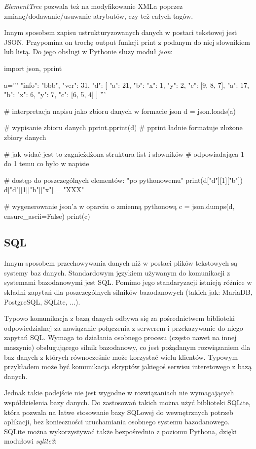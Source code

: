 \textit{ElementTree} pozwala też na modyfikowanie XMLa poprzez zmianę/dodawanie/usuwanie atrybutów, czy też całych tagów.

Innym sposobem zapisu ustrukturyzowanych danych w postaci tekstowej jest JSON. Przypomina on trochę output funkcji print z podanym do niej słownikiem lub listą. Do jego obsługi w Pythonie słuzy moduł \textit{json}:

\begin{CodeFrame*}[python]{}
import json, pprint

a='''{
	"info": "bbb",
	"ver": 31,
	"d": [
		{"a": 21, "b": {"x": 1, "y": 2}, "c": [9, 8, 7]},
		{"a": 17, "b": {"x": 6, "y": 7}, "c": [6, 5, 4]}
	]
}'''

# interpretacja napisu jako zbioru danych w formacie json
d = json.loads(a)

# wypisanie zbioru danych
pprint.pprint(d) # pprint ładnie formatuje złożone zbiory danych

# jak widać jest to zagnieżdżona struktura list i słowników
# odpowiadająca 1 do 1 temu co było w napisie

# dostęp do poszczególnych elementów: "po pythonowemu"
print(d["d"][1]["b"])
d["d"][1]["b"]["x"] = "XXX"

# wygenerowanie json'a w oparciu o zmienną pythonową
c = json.dumps(d, ensure_ascii=False)
print(c)
\end{CodeFrame*}

\subsection{SQL}

Innym sposobem przechowywania danych niż w postaci plików tekstowych są systemy baz danych.
Standardowym językiem używanym do komunikacji z systemami bazodanowymi jest SQL.
Pomimo jego standaryzacji istnieją różnice w składni zapytań dla poszczególnych silników bazodanowych (takich jak: MariaDB, PostgreSQL, SQLite, ...).

Typowo komunikacja z bazą danych odbywa się za pośrednictwem biblioteki odpowiedzialnej za nawiązanie połączenia z serwerem i przekazywanie do niego zapytań SQL.
Wymaga to działania osobnego procesu (często nawet na innej maszynie) obsługującego silnik bazodanowy, co jest pożądanym rozwiązaniem dla baz danych z których równocześnie może korzystać wielu klientów.
Typowym przykładem może być komunikacja skryptów jakiegoś serwisu interetowego z bazą danych.

Jednak takie podejście nie jest wygodne w rozwiązaniach nie wymagających współdzielenia bazy danych.
Do zastosowań takich można użyć biblioteki SQLite, która pozwala na łatwe stosowanie bazy SQLowej do wewnętrznych potrzeb aplikacji, bez konieczności uruchamiania osobnego systemu bazodanowego.
SQLite można wykorzystywać także bezpośrednio z poziomu Pythona, dzięki modułowi \textit{sqlite3}:

